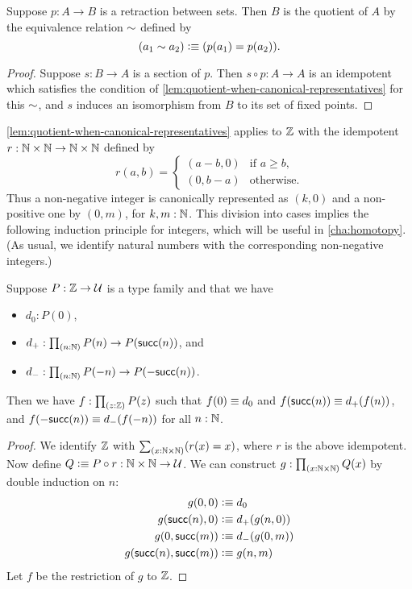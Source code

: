 \begin{cor}\label{thm:retraction-quotient}
  Suppose $p:A\to B$ is a retraction between sets.
  Then $B$ is the quotient of $A$ by the equivalence relation $\sim$ defined by
  \[ (a_1 \sim a_2) \vcentcolon\equiv (p(a_1) = p(a_2)). \]
\end{cor}
\begin{proof}
  Suppose $s:B\to A$ is a section of $p$.
  Then $s\circ p : A\to A$ is an idempotent which satisfies the condition of \autoref{lem:quotient-when-canonical-representatives} for this $\sim$, and $s$ induces an isomorphism from $B$ to its set of fixed points.
\end{proof}

\begin{rmk}\label{Z-quotient-by-canonical-representatives}
\autoref{lem:quotient-when-canonical-representatives} applies to $\mathbb{Z}$ with the idempotent $r : \mathbb{N} \times \mathbb{N} \to \mathbb{N} \times \mathbb{N}$
defined by
%
\begin{equation*}
  r(a, b) =
  \begin{cases}
    (a - b, 0) & \text{if $a \geq b$,} \\
    (0, b - a) & \text{otherwise.}
  \end{cases}  
\end{equation*}
%
Thus a non-negative integer is canonically represented as $(k, 0)$ and a non-positive one by $(0, m)$, for $k,m:\mathbb{N}$.
This division into cases implies the following induction principle for integers, which will be useful in \autoref{cha:homotopy}.
%
(As usual, we identify natural numbers with the corresponding non-negative integers.)
\end{rmk}

\begin{lem}\label{thm:sign-induction}
  Suppose $P:\mathbb{Z}\to\mathcal{U}$ is a type family and that we have
  \begin{itemize}
  \item $d_0: P(0)$,
  \item $d_+: \prd{n:\N} P(n) \to P(\suc(n))$, and
  \item $d_- : \prd{n:\N} P(-n) \to P(-\suc(n))$.
  \end{itemize}
  Then we have $f:\prd{z:\Z} P(z)$ such that $f(0)\equiv d_0$ and $f(\mathsf{succ}(n))\equiv d_+(f(n))$, and $f(-\mathsf{succ}(n))\equiv d_-(f(-n))$ for all $n:\mathbb{N}$.
\end{lem}
\begin{proof}
  We identify $\mathbb{Z}$ with $\sm{x:\N\times\N}(r(x)=x)$, where $r$ is the above idempotent.
  Now define $Q\vcentcolon\equiv P\circ r:\mathbb{N}\times \mathbb{N} \to \mathcal{U}$.
  We can construct $g:\prd{x:\N\times \N} Q(x)$ by double induction on $n$:
  \begin{align*}
    g(0,0) &\vcentcolon\equiv d_0\\
    g(\mathsf{succ}(n),0) &\vcentcolon\equiv d_+(g(n,0))\\
    g(0,\mathsf{succ}(m)) &\vcentcolon\equiv d_-(g(0,m))\\
    g(\mathsf{succ}(n),\mathsf{succ}(m)) &\vcentcolon\equiv g(n,m)
  \end{align*}
  Let $f$ be the restriction of $g$ to $\mathbb{Z}$.
\end{proof}


